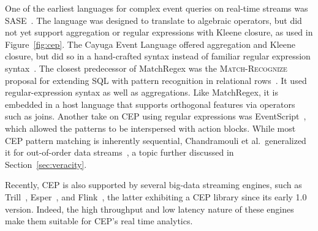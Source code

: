 One of the earliest languages for complex event queries on real-time
streams was \textsf{SASE}~\cite{WuDR06}. The language was designed to translate
to algebraic operators, but did not yet support aggregation or regular
expressions with Kleene closure, as used in Figure~\ref{fig:cep}.
The \textsf{Cayuga} Event Language offered aggregation and Kleene closure, but
did so in a hand-crafted syntax instead of familiar regular expression
syntax~\cite{demers_et_al_2007}.
The closest predecessor of MatchRegex was the \textsc{Match-Recognize}
proposal for extending SQL with pattern recognition in relational
rows~\cite{zemke_et_al_2007}. It used regular-expression syntax as
well as aggregations. Like MatchRegex, it is embedded in a host
language that supports orthogonal features via operators such as
joins.
Another take on CEP using regular expressions was
\textsf{EventScript}~\cite{cohen_kalleberg_2008}, which allowed the patterns to
be interspersed with action blocks.
While most CEP pattern matching is inherently sequential, Chandramouli
et al.\ generalized it for out-of-order data
streams~\cite{chandramouli_goldstein_maier_2010}, a topic further
discussed in Section~\ref{sec:veracity}.



Recently, CEP is also supported by several big-data streaming engines,
such as Trill~\cite{chandramouli_et_al_2014}, Esper~\cite{Esper18},
and Flink~\cite{carbone_et_al_2015}, the latter
exhibiting a CEP library since its early 1.0 version. 
Indeed, the high throughput
and low latency nature of these engines make them suitable for CEP's real
time analytics. 
